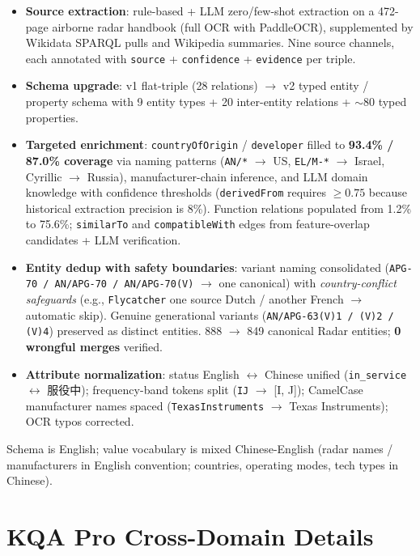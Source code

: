\documentclass[review]{elsarticle}
\begin{document}
\begin{itemize}[topsep=0pt,itemsep=2pt,leftmargin=*]
  \item \textbf{Source extraction}: rule-based + LLM zero/few-shot extraction on a 472-page airborne radar handbook (full OCR with PaddleOCR), supplemented by Wikidata \citep{vrandecic2014wikidata} SPARQL pulls and Wikipedia summaries. Nine source channels, each annotated with \texttt{source} + \texttt{confidence} + \texttt{evidence} per triple.
  \item \textbf{Schema upgrade}: v1 flat-triple (28 relations) $\to$ v2 typed entity / property schema with 9 entity types + 20 inter-entity relations + ${\sim}80$ typed properties.
  \item \textbf{Targeted enrichment}: \texttt{countryOfOrigin} / \texttt{developer} filled to \textbf{93.4\% / 87.0\% coverage} via naming patterns (\texttt{AN/*} $\to$ US, \texttt{EL/M-*} $\to$ Israel, Cyrillic $\to$ Russia), manufacturer-chain inference, and LLM domain knowledge with confidence thresholds (\texttt{derivedFrom} requires $\geq 0.75$ because historical extraction precision is 8\%). Function relations populated from 1.2\% to 75.6\%; \texttt{similarTo} and \texttt{compatibleWith} edges from feature-overlap candidates + LLM verification.
  \item \textbf{Entity dedup with safety boundaries}: variant naming consolidated (\texttt{APG-70 / AN/APG-70 / AN/APG-70(V)} $\to$ one canonical) with \emph{country-conflict safeguards} (e.g., \texttt{Flycatcher} one source Dutch / another French $\to$ automatic skip). Genuine generational variants (\texttt{AN/APG-63(V)1 / (V)2 / (V)4}) preserved as distinct entities. 888 $\to$ 849 canonical Radar entities; \textbf{0 wrongful merges} verified.
  \item \textbf{Attribute normalization}: status English $\leftrightarrow$ Chinese unified (\texttt{in\_service} $\leftrightarrow$ 服役中); frequency-band tokens split (\texttt{IJ} $\to$ [I, J]); CamelCase manufacturer names spaced (\texttt{TexasInstruments} $\to$ Texas Instruments); OCR typos corrected.
\end{itemize}

Schema is English; value vocabulary is mixed Chinese-English (radar names / manufacturers in English convention; countries, operating modes, tech types in Chinese).

\section{KQA Pro Cross-Domain Details}
\label{app:kqapro}
\end{document}
